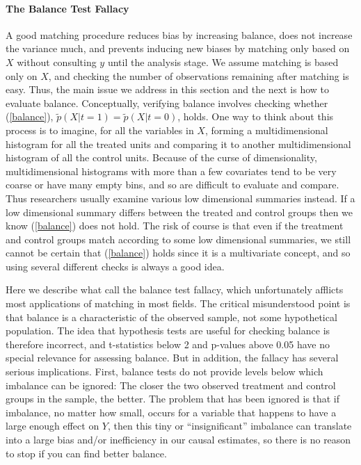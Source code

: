 \documentclass[11pt,titlepage]{article}
\begin{document}
\paragraph{The Balance Test Fallacy}

A good matching procedure reduces bias by increasing balance, does not
increase the variance much, and prevents inducing new biases by
matching only based on $X$ without consulting $y$ until the analysis
stage.  We assume matching is based only on $X$, and checking the
number of observations remaining after matching is easy.  Thus, the
main issue we address in this section and the next is how to evaluate
balance.  Conceptually, verifying balance involves checking whether
(\ref{balance}), $\tilde p(X|t=1)=\tilde p(X|t=0)$, holds.  One way to
think about this process is to imagine, for all the variables in $X$,
forming a multidimensional histogram for all the treated units and
comparing it to another multidimensional histogram of all the control
units.  Because of the curse of dimensionality, multidimensional
histograms with more than a few covariates tend to be very coarse or
have many empty bins, and so are difficult to evaluate and compare.
Thus researchers usually examine various low dimensional summaries
instead.  If a low dimensional summary differs between the treated and
control groups then we know (\ref{balance}) does not hold.  The risk
of course is that even if the treatment and control groups match
according to some low dimensional summaries, we still cannot be
certain that (\ref{balance}) holds since it is a multivariate concept,
and so using several different checks is always a good idea.

Here we describe what \citet{ImaKinStu05} call the balance test
fallacy, which unfortunately afflicts most applications of matching in
most fields.  The critical misunderstood point is that balance is a
characteristic of the observed sample, not some hypothetical
population.  The idea that hypothesis tests are useful for checking
balance is therefore incorrect, and t-statistics below 2 and p-values
above 0.05 have no special relevance for assessing balance.  But in
addition, the fallacy has several serious implications.  First,
balance tests do not provide levels below which imbalance can be
ignored: The closer the two observed treatment and control groups in
the sample, the better.  The problem that has been ignored is that if
imbalance, no matter how small, occurs for a variable that happens to
have a large enough effect on $Y$, then this tiny or ``insignificant''
imbalance can translate into a large bias and/or inefficiency in our
causal estimates, so there is no reason to stop if you can find better
balance.  
\end{document}

